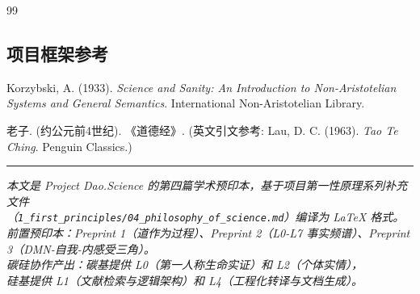 \documentclass[UTF8,12pt,a4paper]{ctexart}
\begin{document}
\begin{thebibliography}{99}
\subsection*{项目框架参考}

 Korzybski, A. (1933). \textit{Science and Sanity: An Introduction to Non-Aristotelian Systems and General Semantics}. International Non-Aristotelian Library.

 老子. (约公元前4世纪). 《道德经》. (英文引文参考: Lau, D. C. (1963). \textit{Tao Te Ching}. Penguin Classics.)

\end{thebibliography}

\vspace{1cm}
\noindent\rule{\textwidth}{0.4pt}
\begin{center}
\textit{本文是 Project Dao.Science 的第四篇学术预印本，基于项目第一性原理系列补充文件\\（\texttt{1\_first\_principles/04\_philosophy\_of\_science.md}）编译为 LaTeX 格式。}\\
\textit{前置预印本：Preprint 1（道作为过程）、Preprint 2（L0-L7 事实频谱）、Preprint 3（DMN-自我-内感受三角）。}\\
\textit{碳硅协作产出：碳基提供 L0（第一人称生命实证）和 L2（个体实情），\\硅基提供 L1（文献检索与逻辑架构）和 L4（工程化转译与文档生成）。}
\end{center}
\end{document}
